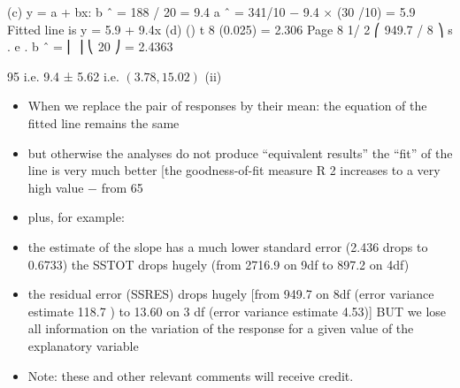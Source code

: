 \documentclass[a4paper,12pt]{article}
\begin{document}
(c)
y = a + bx:
b ˆ = 188 / 20 = 9.4
a ˆ = 341/10 − 9.4 × (30 /10) = 5.9
Fitted line is y = 5.9 + 9.4x
(d)
()
t 8 (0.025) = 2.306
Page 8
1/ 2
⎛ 949.7 / 8 ⎞
s . e . b ˆ = ⎜
⎟
⎝ 20 ⎠
= 2.4363

95%
i.e. 9.4 ± 5.62 i.e. $(3.78, 15.02)$
(ii)
\begin{itemize}
\item When we replace the pair of responses by their mean:
the equation of the fitted line remains the same
\item but otherwise the analyses do not produce “equivalent results”
the “fit” of the line is very much better [the goodness-of-fit measure R 2 increases
to a very high value − from 65%
\item plus, for example:
\item the estimate of the slope has a much lower standard error (2.436 drops to 0.6733)
the SSTOT drops hugely (from 2716.9 on 9df to 897.2 on 4df)
\item the residual error (SSRES) drops hugely [from 949.7 on 8df (error variance
estimate 118.7 ) to 13.60 on 3 df (error variance estimate 4.53)]
BUT we lose all information on the variation of the response for a given value of
the explanatory variable
\item Note: these and other relevant comments will receive credit.
\end{itemize}
\end{document}

